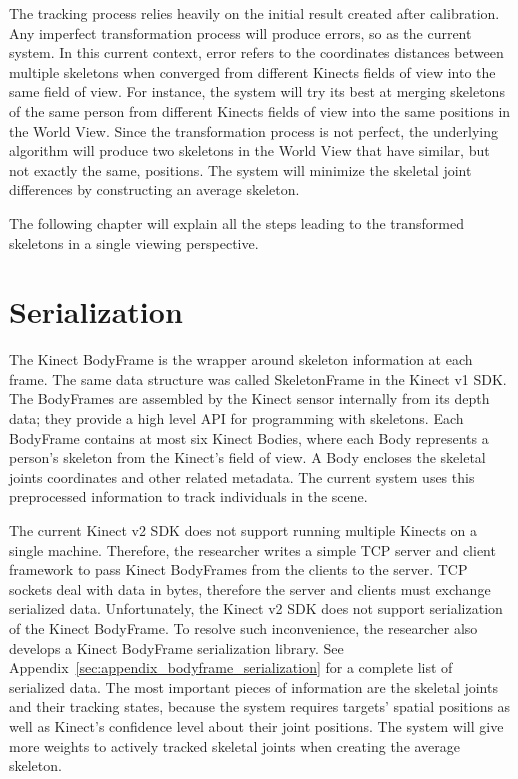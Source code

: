 The tracking process relies heavily on the initial result created after calibration. Any imperfect transformation process will produce errors, so as the current system. In this current context, error refers to the coordinates distances between multiple skeletons when converged from different Kinects fields of view into the same field of view. For instance, the system will try its best at merging skeletons of the same person from different Kinects fields of view into the same positions in the World View. Since the transformation process is not perfect, the underlying algorithm will produce two skeletons in the World View that have similar, but not exactly the same, positions. The system will minimize the skeletal joint differences by constructing an average skeleton.

The following chapter will explain all the steps leading to the transformed skeletons in a single viewing perspective.

\section{Serialization}
\label{sec:current_approach_serialization}

The Kinect BodyFrame is the wrapper around skeleton information at each frame. The same data structure was called SkeletonFrame in the Kinect v1 SDK. The BodyFrames are assembled by the Kinect sensor internally from its depth data; they provide a high level API for programming with skeletons. Each BodyFrame contains at most six Kinect Bodies, where each Body represents a person's skeleton from the Kinect's field of view. A Body encloses the skeletal joints coordinates and other related metadata. The current system uses this preprocessed information to track individuals in the scene.

The current Kinect v2 SDK does not support running multiple Kinects on a single machine. Therefore, the researcher writes a simple TCP server and client framework to pass Kinect BodyFrames from the clients to the server. TCP sockets deal with data in bytes, therefore the server and clients must exchange serialized data. Unfortunately, the Kinect v2 SDK does not support serialization of the Kinect BodyFrame. To resolve such inconvenience, the researcher also develops a Kinect BodyFrame serialization library. See Appendix~\ref{sec:appendix_bodyframe_serialization} for a complete list of serialized data. The most important pieces of information are the skeletal joints and their tracking states, because the system requires targets' spatial positions as well as Kinect's confidence level about their joint positions. The system will give more weights to actively tracked skeletal joints when creating the average skeleton.

